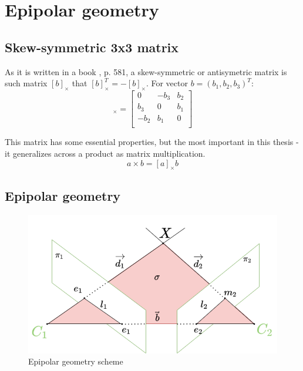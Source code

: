 \section{Epipolar geometry}

\subsection{Skew-symmetric 3x3 matrix}
As it is written in a book \cite{hartley_zisserman_2004}, p. 581, a skew-symmetric or antisymetric matrix is such matrix $[b]_{\times}$ that $[b]_{\times}^T = -[b]_{\times}$. 
For vector $b = (b_1, b_2, b_3)^T$:
\begin{equation}
    [b]_{\times} = \begin{bmatrix}
        0 & -b_3 & b_2 \\ 
        b_3 & 0 & b_1 \\ 
        -b_2 & b_1 & 0 \\ 
    \end{bmatrix}    
\end{equation}

This matrix has some essential properties, but the most important in this thesis - it generalizes across a product as matrix multiplication.
\begin{equation}
    a \times b = [a]_{\times} b
\end{equation}

\subsection{Epipolar geometry}
\begin{figure}[h]
    \centering
    \includegraphics[width=1\textwidth]{graphics/epipolar.png}
    \caption{Epipolar geometry scheme}
    \label{fig:epipolar_std}
\end{figure}

